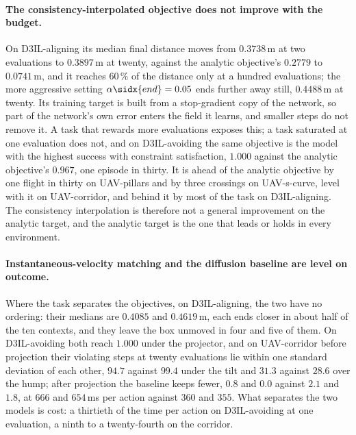 \paragraph{The consistency-interpolated objective does not improve with the budget.} On D3IL-aligning
its median final distance moves from $0.3738$\,m at two evaluations to $0.3897$\,m at twenty, against
the analytic objective's $0.2779$ to $0.0741$\,m, and it reaches $60\,\%$ of the distance only at a
hundred evaluations; the more aggressive setting $\alpha\sidx{end} = 0.05$ ends further away still,
$0.4488$\,m at twenty. Its training target is built from a stop-gradient copy of the network, so part
of the network's own error enters the field it learns, and smaller steps do not remove it. A task that
rewards more evaluations exposes this; a task saturated at one evaluation does not, and on
D3IL-avoiding the same objective is the model with the highest success with constraint satisfaction,
$1.000$ against the analytic objective's $0.967$, one episode in thirty. It is ahead of the analytic
objective by one flight in thirty on UAV-pillars and by three crossings on UAV-s-curve, level with it
on UAV-corridor, and behind it by most of the task on D3IL-aligning. The consistency interpolation is
therefore not a general improvement on the analytic target, and the analytic target is the one that
leads or holds in every environment.

\paragraph{Instantaneous-velocity matching and the diffusion baseline are level on outcome.} Where
the task separates the objectives, on D3IL-aligning, the two have no ordering: their medians are
$0.4085$ and $0.4619$\,m, each ends closer in about half of the ten contexts, and they leave the box
unmoved in four and five of them. On D3IL-avoiding both reach $1.000$ under the projector, and on
UAV-corridor before projection their violating steps at twenty evaluations lie within one standard
deviation of each other, $94.7$ against $99.4$ under the tilt and $31.3$ against $28.6$ over the hump;
after projection the baseline keeps fewer, $0.8$ and $0.0$ against $2.1$ and $1.8$, at $666$ and
$654$\,ms per action against $360$ and $355$. What separates the two models is cost: a thirtieth of the
time per action on D3IL-avoiding at one evaluation, a ninth to a twenty-fourth on the corridor.

